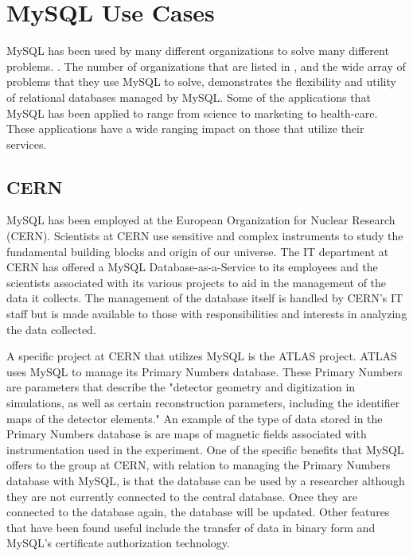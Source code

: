 \documentclass[9pt,twocolumn,twoside]{styles/osajnl}
\begin{document}
\section{MySQL Use Cases}
MySQL has been used by many different organizations to solve many
different problems. \cite{mysqlcase}. The number of organizations that
are listed in \cite{mysqlcase}, and the wide array of problems that
they use MySQL to solve, demonstrates the flexibility and utility of
relational databases managed by MySQL. Some of the applications that
MySQL has been applied to range from science to marketing to
health-care. \cite{mysqlcase} These applications have a wide ranging
impact on those that utilize their services. \newline
\newline

\subsection{CERN}
MySQL has been employed at the European Organization for Nuclear
Research (CERN). \cite{mysqlcern} Scientists at CERN use sensitive and
complex instruments to study the fundamental building blocks and
origin of our universe. \cite{mysqlcern} The IT department at CERN has
offered a MySQL Database-as-a-Service to its employees and the
scientists associated with its various projects to aid in the
management of the data it collects. \cite{mysqlcern} The management of
the database itself is handled by CERN's IT staff but is made
available to those with responsibilities and interests in analyzing
the data collected. \cite{primarynumbers}

A specific project at CERN that utilizes MySQL is the ATLAS
project. \cite{primarynumbers} ATLAS uses MySQL to manage its Primary
Numbers database. \cite{primarynumbers} These Primary Numbers are
parameters that describe the "detector geometry and digitization in
simulations, as well as certain reconstruction parameters, including
the identifier maps of the detector elements." \cite{primarynumbers}
An example of the type of data stored in the Primary Numbers database
is are maps of magnetic fields associated with instrumentation used in
the experiment. \cite{primarynumbers} One of the specific benefits
that MySQL offers to the group at CERN, with relation to managing the
Primary Numbers database with MySQL, is that the database can be used
by a researcher although they are not currently connected to the
central database. \cite{primarynumbers} Once they are connected to the
database again, the database will be updated. \cite{primarynumbers}
Other features that have been found useful include the transfer of
data in binary form and MySQL's certificate authorization
technology. \cite{primarynumbers}
\end{document}
